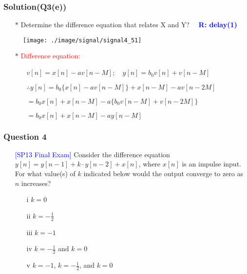 \documentclass{beamer}
\newcommand{\blue}[1]{\textcolor{blue}{#1}}
\newcommand{\red}[1]{\textcolor{red}{#1}}
\begin{document}
\begin{frame}
\frametitle{Solution(Q3(e))}

\begin{itemize} \itemsep1pt \parskip0pt 
  \item[$\ast$] Determine the difference equation that relates X and Y?  ~~\blue{\bf R: delay(1)}
\end{itemize}

\begin{figure}[H]
  \label{signal4_5}
  \centering
  \texttt{[image: ./image/signal/signal4\_51]}
\end{figure}

\begin{itemize} \itemsep1pt \parskip0pt 
  \item[$\ast$] \red{Difference equation:}
  \begin{itemize} \itemsep1pt \parskip0pt 
    \item[] $v[n] = x[n] - av[n-M]; $~~$y[n] = b_0v[n] + v[n-M]$
    \item[] $\therefore y[n] = b_0 \{ x[n]-av[n-M]\} + x[n-M]-av[n-2M]$
    \item[] \hspace{10 mm}$= b_0x[n] + x[n-M]-a \{ b_0v[n-M] + v[n-2M]\}$
    \item[] \hspace{10 mm}$= b_0x[n] + x[n-M] - ay[n-M]$
  \end{itemize}
\end{itemize}

\end{frame}


\begin{frame}
\frametitle{Question 4}

\begin{itemize} \itemsep1pt \parskip0pt 
  \item[] \blue{[SP13 Final Exam]} Consider the difference equation $y[n] = y[n-1] + k \cdot y[n-2] + x[n]$, where $x[n]$ is an impulse input. For what value(s) of $k$ indicated below would the output converge to zero as $n$ increases?
  \begin{itemize} \itemsep1pt \parskip0pt 
    \item[i] $k = 0$
    \item[ii] $k = -\frac{1}{2}$
    \item[iii] $k = -1$
    \item[iv] $k = -\frac{1}{2}$ and $k = 0$
    \item[v] $k = -1$, $k = -\frac{1}{2}$, and $k = 0$
  \end{itemize}
\end{itemize}

\vspace{6 cm}


\end{frame}
\end{document}
